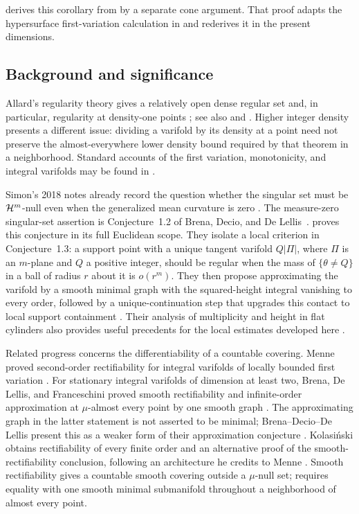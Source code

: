  derives this corollary from  by a
separate cone argument. That proof adapts the hypersurface first-variation
calculation in \cite[Lemma~6.1]{OpenAISolomonYau2026} and rederives it in
the present dimensions.

\subsection{Background and significance}

Allard's regularity theory gives a relatively open dense regular set and, in
particular, regularity at density-one points \cite{Allard1972}; see also
\cite[Theorem~23]{Allard1987} and
\cite[Chapter~5, Theorem~6.1 and Corollary~6.3]{Simon2018}. Higher integer
density presents a different issue: dividing a varifold by its density at a
point need not preserve the almost-everywhere lower density bound required by
that theorem in a neighborhood. Standard accounts of the first variation,
monotonicity, and integral varifolds may be found in \cite{Simon1983}.

Simon's 2018 notes already record the question whether the singular set
must be $\mathcal H^m$-null even when the generalized mean curvature is zero
\cite[Chapter~5, Remark~6.4]{Simon2018}. The measure-zero singular-set
assertion is Conjecture~1.2 of Brena, Decio,
and De Lellis~\cite{BDD2025}.  proves this conjecture in its
full Euclidean scope. They isolate a local criterion in Conjecture~1.3:
a support point with a unique tangent varifold $Q|\Pi|$, where $\Pi$ is an
$m$-plane and $Q$ a positive integer, should be regular when the mass of
$\{\theta\ne Q\}$ in a ball of radius $r$ about it is $o(r^m)$.
They then propose approximating the varifold by a smooth minimal graph
with the squared-height integral vanishing to every order, followed by a
unique-continuation step that upgrades this contact to local support containment
\cite[Conjectures~1.3--1.5]{BDD2025}. Their analysis of multiplicity and
height in flat cylinders also provides useful precedents for the local
estimates developed here \cite[Theorem~1.9 and Lemma~2.3]{BDD2025}.

Related progress concerns the differentiability of a countable covering.
Menne proved second-order rectifiability for integral varifolds of
locally bounded first variation \cite[Theorem~3.6]{Menne2013}. For stationary
integral varifolds of dimension at least two, Brena, De Lellis, and
Franceschini proved smooth rectifiability and infinite-order approximation
at $\mu$-almost every point by one smooth graph
\cite[Theorems~1.2 and~1.3]{BDLF2025}. The approximating graph in the latter
statement is not asserted to be minimal; Brena--Decio--De Lellis present
this as a weaker form of their approximation conjecture
\cite[Theorem~1.8]{BDD2025}. Kolasi\'nski obtains rectifiability of every
finite order and an alternative proof of the smooth-rectifiability
conclusion, following an architecture he credits to Menne
\cite[Theorem~1.1, Corollary~10.8, and the historical note in Section~1]
{Kolasinski2026}.
Smooth rectifiability gives a countable smooth covering outside a
$\mu$-null set;  requires equality with one smooth minimal
submanifold throughout a neighborhood of almost every point.


